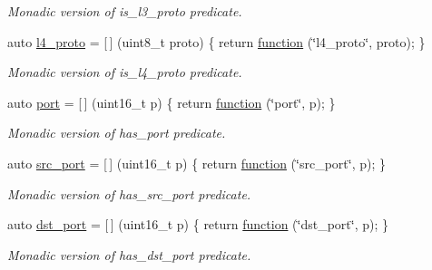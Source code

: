 \begin{DoxyCompactItemize}
\begin{DoxyCompactList}\small\item\em Monadic version of {\ttfamily is\+\_\+l3\+\_\+proto} predicate. \end{DoxyCompactList}\item 
auto \hyperlink{namespacepfq_1_1lang_1_1anonymous__namespace_02default_8hpp_03_a8ad2208c91dc3cd4378e715aab5fb4b7}{l4\+\_\+proto} = \mbox{[}$\,$\mbox{]} (uint8\+\_\+t proto) \{ return \hyperlink{namespacepfq_1_1lang_a1a4638059d700ae08d0ca63886ff2bb3}{function} (\char`\"{}l4\+\_\+proto\char`\"{}, proto); \}
\begin{DoxyCompactList}\small\item\em Monadic version of {\ttfamily is\+\_\+l4\+\_\+proto} predicate. \end{DoxyCompactList}\item 
auto \hyperlink{namespacepfq_1_1lang_1_1anonymous__namespace_02default_8hpp_03_a868eca03290a037cb4e9b7075085888b}{port} = \mbox{[}$\,$\mbox{]} (uint16\+\_\+t p) \{ return \hyperlink{namespacepfq_1_1lang_a1a4638059d700ae08d0ca63886ff2bb3}{function} (\char`\"{}port\char`\"{}, p); \}
\begin{DoxyCompactList}\small\item\em Monadic version of {\ttfamily has\+\_\+port} predicate. \end{DoxyCompactList}\item 
auto \hyperlink{namespacepfq_1_1lang_1_1anonymous__namespace_02default_8hpp_03_ad1645151270994a4f396565b70233b73}{src\+\_\+port} = \mbox{[}$\,$\mbox{]} (uint16\+\_\+t p) \{ return \hyperlink{namespacepfq_1_1lang_a1a4638059d700ae08d0ca63886ff2bb3}{function} (\char`\"{}src\+\_\+port\char`\"{}, p); \}
\begin{DoxyCompactList}\small\item\em Monadic version of {\ttfamily has\+\_\+src\+\_\+port} predicate. \end{DoxyCompactList}\item 
auto \hyperlink{namespacepfq_1_1lang_1_1anonymous__namespace_02default_8hpp_03_a25a3b35caf255c109a6c5b4f601b1b61}{dst\+\_\+port} = \mbox{[}$\,$\mbox{]} (uint16\+\_\+t p) \{ return \hyperlink{namespacepfq_1_1lang_a1a4638059d700ae08d0ca63886ff2bb3}{function} (\char`\"{}dst\+\_\+port\char`\"{}, p); \}
\begin{DoxyCompactList}\small\item\em Monadic version of {\ttfamily has\+\_\+dst\+\_\+port} predicate. \end{DoxyCompactList}\item 

\end{DoxyCompactItemize}
